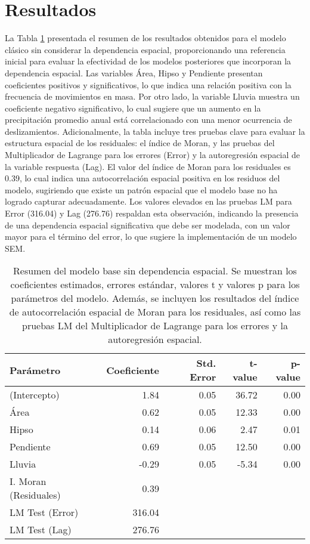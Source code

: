 \documentclass[
  manuscript=article,  
  layout=preprint,  
  year=2023,
  volume=0,
]{format}
\begin{document}
\section{Resultados}
La Tabla \ref{tab:lm_summary} presentada el resumen de los resultados obtenidos para el modelo clásico sin considerar la dependencia espacial, proporcionando una referencia inicial para evaluar la efectividad de los modelos posteriores que incorporan la dependencia espacial. Las variables Área, Hipso y Pendiente presentan coeficientes positivos y significativos, lo que indica una relación positiva con la frecuencia de movimientos en masa. Por otro lado, la variable Lluvia muestra un coeficiente negativo significativo, lo cual sugiere que un aumento en la precipitación promedio anual está correlacionado con una menor ocurrencia de deslizamientos. Adicionalmente, la tabla incluye tres pruebas clave para evaluar la estructura espacial de los residuales: el índice de Moran, y las pruebas del Multiplicador de Lagrange para los errores (Error) y la autoregresión espacial de la variable respuesta (Lag). El valor del índice de Moran para los residuales es 0.39, lo cual indica una autocorrelación espacial positiva en los residuos del modelo, sugiriendo que existe un patrón espacial que el modelo base no ha logrado capturar adecuadamente. Los valores elevados en las pruebas LM para Error (316.04) y Lag (276.76) respaldan esta observación, indicando la presencia de una dependencia espacial significativa que debe ser modelada, con un valor mayor para el término del error, lo que sugiere la implementación de un modelo SEM.

\begin{table}[ht]
\centering
\begin{tabular}{lrrrr}
  \hline
Parámetro & Coeficiente & Std. Error & t-value & p-value \\ 
  \hline
(Intercepto) & 1.84 & 0.05 & 36.72 & 0.00 \\ 
  Área & 0.62 & 0.05 & 12.33 & 0.00 \\ 
  Hipso & 0.14 & 0.06 & 2.47 & 0.01 \\ 
  Pendiente & 0.69 & 0.05 & 12.50 & 0.00 \\ 
  Lluvia & -0.29 & 0.05 & -5.34 & 0.00 \\
  \hline 
  I. Moran (Residuales) & 0.39 &  &  &  \\ 
  LM Test (Error) & 316.04 &  &  &  \\ 
  LM Test (Lag) & 276.76 &  &  &  \\ 
   \hline
\end{tabular}
\caption{Resumen del modelo base sin dependencia espacial. Se muestran los coeficientes estimados, errores estándar, valores t y valores p para los parámetros del modelo. Además, se incluyen los resultados del índice de autocorrelación espacial de Moran para los residuales, así como las pruebas LM del Multiplicador de Lagrange para los errores y la autoregresión espacial.} 
\label{tab:lm_summary}
\end{table}
\end{document}
